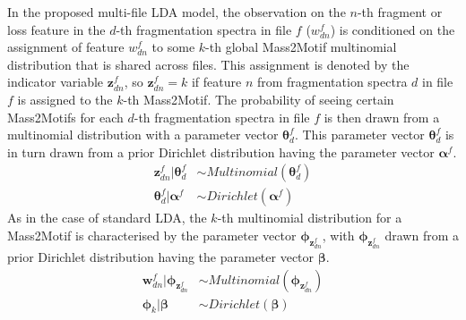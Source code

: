 In the proposed multi-file LDA model, the observation on the $n$-th fragment or loss feature in the $d$-th fragmentation spectra in file $f$ ($w_{dn}^f$) is conditioned on the assignment of feature $w_{dn}^f$ to some $k$-th global Mass2Motif multinomial distribution that is shared across files. This assignment is denoted by the indicator variable $\boldsymbol{z}_{dn}^f$, so $\boldsymbol{z}_{dn}^f=k$ if feature $n$ from fragmentation spectra $d$ in file $f$ is assigned to the $k$-th Mass2Motif. The probability of seeing certain Mass2Motifs for each $d$-th fragmentation spectra in file $f$ is then drawn from a multinomial distribution with a parameter vector $\boldsymbol{\theta}_{d}^f$. This parameter vector $\boldsymbol{\theta}_{d}^f$ is in turn drawn from a prior Dirichlet distribution having the parameter vector $\boldsymbol{\alpha}^f$. 
\begin{align}
\boldsymbol{z}_{dn}^f \vert \boldsymbol{\theta}_{d}^f &\sim Multinomial(\boldsymbol{\theta}_{d}^f) \label{eq:dir-multi-1a}\\
\boldsymbol{\theta}_{d}^f \vert \boldsymbol{\alpha}^f &\sim Dirichlet(\boldsymbol{\alpha}^f) \label{eq:dir-multi-1b}
\end{align}
As in the case of standard LDA, the $k$-th multinomial distribution for a Mass2Motif is characterised by the parameter vector $\boldsymbol{\phi}_{\boldsymbol{z}_{dn}^f}$, with $\boldsymbol{\phi}_{\boldsymbol{z}_{dn}^f}$ drawn from a prior Dirichlet distribution having the parameter vector $\boldsymbol{\beta}$. 
\begin{align}
\boldsymbol{w}_{dn}^f \vert \boldsymbol{\phi}_{\boldsymbol{z}_{dn}^f} &\sim Multinomial(\boldsymbol{\phi}_{\boldsymbol{z}_{dn}^f}) \label{eq:dir-multi-2a} \\
\boldsymbol{\phi}_{k} \vert \boldsymbol{\beta} &\sim Dirichlet(\boldsymbol{\beta}) \label{eq:dir-multi-2b}
\end{align}


